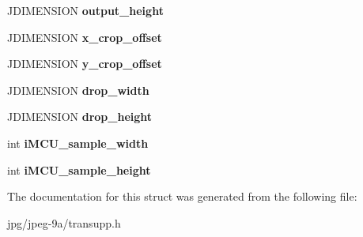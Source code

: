 \begin{DoxyCompactItemize}
\item 
\hypertarget{structjpeg__transform__info_a2fad8399e6b85f850152929e279eace5}{J\+D\+I\+M\+E\+N\+S\+I\+O\+N {\bfseries output\+\_\+height}}\label{structjpeg__transform__info_a2fad8399e6b85f850152929e279eace5}

\item 
\hypertarget{structjpeg__transform__info_ad96a77528f72b2251b94d04ae396b435}{J\+D\+I\+M\+E\+N\+S\+I\+O\+N {\bfseries x\+\_\+crop\+\_\+offset}}\label{structjpeg__transform__info_ad96a77528f72b2251b94d04ae396b435}

\item 
\hypertarget{structjpeg__transform__info_adeadce805b25751fd43263e2fcd2e166}{J\+D\+I\+M\+E\+N\+S\+I\+O\+N {\bfseries y\+\_\+crop\+\_\+offset}}\label{structjpeg__transform__info_adeadce805b25751fd43263e2fcd2e166}

\item 
\hypertarget{structjpeg__transform__info_a6c63db1d6f705cc9e4bccd2efee11bde}{J\+D\+I\+M\+E\+N\+S\+I\+O\+N {\bfseries drop\+\_\+width}}\label{structjpeg__transform__info_a6c63db1d6f705cc9e4bccd2efee11bde}

\item 
\hypertarget{structjpeg__transform__info_a4e51b93c0ac407e998e8d643465c48bb}{J\+D\+I\+M\+E\+N\+S\+I\+O\+N {\bfseries drop\+\_\+height}}\label{structjpeg__transform__info_a4e51b93c0ac407e998e8d643465c48bb}

\item 
\hypertarget{structjpeg__transform__info_a6c67f5ce5320a5d532acd6a6df14f1f4}{int {\bfseries i\+M\+C\+U\+\_\+sample\+\_\+width}}\label{structjpeg__transform__info_a6c67f5ce5320a5d532acd6a6df14f1f4}

\item 
\hypertarget{structjpeg__transform__info_a6b6606b8e8315e161fda4ddb29b2d410}{int {\bfseries i\+M\+C\+U\+\_\+sample\+\_\+height}}\label{structjpeg__transform__info_a6b6606b8e8315e161fda4ddb29b2d410}

\end{DoxyCompactItemize}


The documentation for this struct was generated from the following file\+:\begin{DoxyCompactItemize}
\item 
jpg/jpeg-\/9a/transupp.\+h\end{DoxyCompactItemize}
